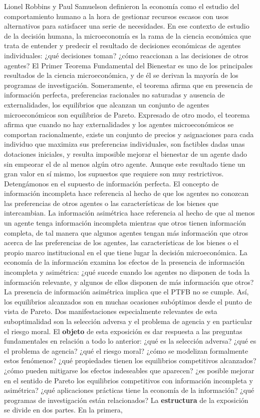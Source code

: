 \documentclass{nuevotema}
\begin{document}
\ideaclave

Lionel Robbins y Paul Samuelson definieron la economía como el estudio del comportamiento humano a la hora de gestionar recursos escasos con usos alternativos para satisfacer una serie de necesidades. En ese contexto de estudio de la decisión humana, la microeconomía es la rama de la ciencia económica que trata de entender y predecir el resultado de decisiones económicas de agentes individuales: ¿qué decisiones toman? ¿cómo reaccionan a las decisiones de otros agentes? El Primer Teorema Fundamental del Bienestar es uno de los principales resultados de la ciencia microeconómica, y de él se derivan la mayoría de los programas de investigación. Someramente, el teorema afirma que en presencia de información perfecta, preferencias racionales no saturadas y ausencia de externalidades, los equilibrios que alcanzan un conjunto de agentes microeconómicos son equilibrios de Pareto. Expresado de otro modo, el teorema afirma que cuando no hay externalidades y los agentes microeconómicos se comportan racionalmente, existe un conjunto de precios y asignaciones para cada individuo que maximiza sus preferencias individuales, son factibles dadas unas dotaciones iniciales, y resulta imposible mejorar el bienestar de un agente dado sin empeorar el de al menos algún otro agente. Aunque este resultado tiene un gran valor en sí mismo, los supuestos que requiere son muy restrictivos. Detengámonos en el supuesto de información perfecta. El concepto de información incompleta hace referencia al hecho de que los agentes no conozcan las preferencias de otros agentes o las características de los bienes que intercambian. La información asimétrica hace referencia al hecho de que al menos un agente tenga información incompleta mientras que otros tienen información completa, de tal manera que algunos agentes tengan más información que otros acerca de las preferencias de los agentes, las características de los bienes o el propio marco institucional en el que tiene lugar la decisión microeconómica. La economía de la información examina los efectos de la presencia de información incompleta y asimétrica: ¿qué sucede cuando los agentes no disponen de toda la información relevante, y algunos de ellos disponen de más información que otros? La presencia de información asimétrica implica que el PTFB no se cumple. Así, los equilibrios alcanzados son en muchas ocasiones subóptimos desde el punto de vista de Pareto. Dos manifestaciones especialmente relevantes de esta suboptimalidad son la selección adversa y el problema de agencia y en particular el riesgo moral. El \textbf{objeto} de esta exposición es dar respuesta a las preguntas fundamentales en relación a todo lo anterior: ¿qué es la selección adversa? ¿qué es el problema de agencia? ¿qué el riesgo moral? ¿cómo se modelizan formalmente estos fenómenos? ¿qué propiedades tienen los equilibrios competitivos alcanzados? ¿cómo pueden mitigarse los efectos indeseables que aparecen? ¿es posible mejorar en el sentido de Pareto los equilibrios competitivos con información incompleta y asimétrica? ¿qué aplicaciones prácticas tiene la economía de la información? ¿qué programas de investigación están relacionados? La \textbf{estructura} de la exposición se divide en dos partes. En la primera, 
\end{document}
